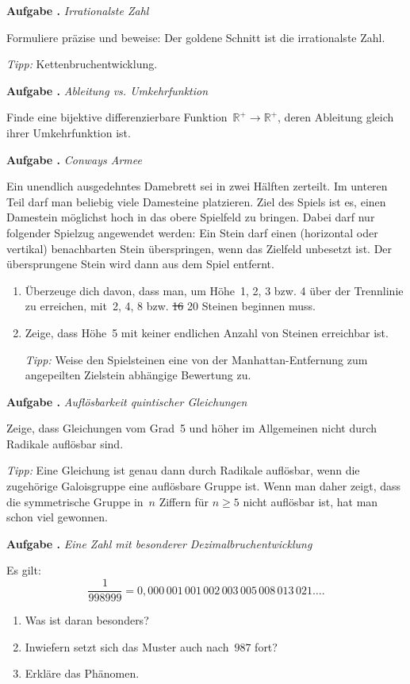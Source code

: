 \documentclass[a4paper,ngerman]{scrartcl}
\newlength{\aufgabenskip}
\newcounter{aufgabennummer}
\newenvironment{aufgabe}[1]{
  \addtocounter{aufgabennummer}{1}
  \textbf{Aufgabe \theaufgabennummer.} \emph{#1} \par
}{\vspace{\aufgabenskip}}
\newcommand{\RR}{\mathbb{R}}
\begin{document}
\begin{aufgabe}{Irrationalste Zahl}
Formuliere präzise und beweise: Der goldene Schnitt ist die irrationalste Zahl.

\emph{Tipp:} Kettenbruchentwicklung.
\end{aufgabe}

\begin{aufgabe}{Ableitung vs. Umkehrfunktion}
Finde eine bijektive differenzierbare Funktion~$\RR^+ \to \RR^+$, deren
Ableitung gleich ihrer Umkehrfunktion ist.
\end{aufgabe}

\begin{aufgabe}{Conways Armee}
Ein unendlich ausgedehntes Damebrett sei in zwei Hälften zerteilt. Im unteren
Teil darf man beliebig viele Damesteine platzieren. Ziel des Spiels ist es,
einen Damestein möglichst hoch in das obere Spielfeld zu
bringen. Dabei darf nur folgender Spielzug angewendet werden: Ein Stein
darf einen (horizontal oder vertikal) benachbarten Stein überspringen, wenn das
Zielfeld unbesetzt ist. Der übersprungene Stein wird dann aus dem Spiel
entfernt.
\begin{enumerate}
\item Überzeuge dich davon, dass man, um Höhe~1, 2, 3 bzw. 4 über der
Trennlinie zu erreichen, mit~2, 4, 8 bzw. \sout{16} 20 Steinen beginnen muss.
\item Zeige, dass Höhe~5 mit keiner endlichen Anzahl von Steinen erreichbar
ist.

\emph{Tipp:} Weise den Spielsteinen eine von der Manhattan-Entfernung zum
angepeilten Zielstein abhängige Bewertung zu.
\end{enumerate}
\end{aufgabe}

\begin{aufgabe}{Auflösbarkeit quintischer Gleichungen}
Zeige, dass Gleichungen vom Grad~5 und höher im Allgemeinen nicht durch
Radikale auflösbar sind.

\emph{Tipp:} Eine Gleichung ist genau dann durch Radikale auflösbar, wenn die
zugehörige Galoisgruppe eine auflösbare Gruppe ist. Wenn man daher zeigt, dass
die symmetrische Gruppe in~$n$ Ziffern für $n \geq 5$ nicht auflösbar ist, hat
man schon viel gewonnen.
\end{aufgabe}

\begin{aufgabe}{Eine Zahl mit besonderer Dezimalbruchentwicklung}
Es gilt:
\[ \frac{1}{998999} =
  0{,}000\,001\,001\,002\,003\,005\,008\,013\,021\ldots. \]
\begin{enumerate}
\item Was ist daran besonders?
\item Inwiefern setzt sich das Muster auch nach~$987$ fort?
\item Erkläre das Phänomen.
\end{enumerate}
\end{aufgabe}
\end{document}
